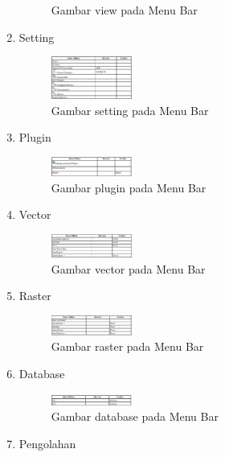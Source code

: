 \begin{enumerate}
\begin{figure}[ht]
    \caption{Gambar view pada Menu Bar}
    \label{qgis:menubar2}
    \end{figure}
\item
Setting
\begin{figure}[ht]
    \centerline{\includegraphics[width=0.25\textwidth]{figures/menubar3}}
    \caption{Gambar setting pada Menu Bar}
    \label{qgis:menubar3}
    \end{figure}
\item
Plugin
\begin{figure}[ht]
    \centerline{\includegraphics[width=0.25\textwidth]{figures/menubar4}}
    \caption{Gambar plugin pada Menu Bar}
    \label{qgis:menubar4}
    \end{figure}
\item
Vector
\begin{figure}[ht]
    \centerline{\includegraphics[width=0.25\textwidth]{figures/menubar5}}
    \caption{Gambar vector pada Menu Bar}
    \label{qgis:menubar5}
    \end{figure}
\item
Raster
\begin{figure}[ht]
    \centerline{\includegraphics[width=0.25\textwidth]{figures/menubar6}}
    \caption{Gambar raster pada Menu Bar}
    \label{qgis:menubar6}
    \end{figure}
\item
Database
\begin{figure}[ht]
    \centerline{\includegraphics[width=0.25\textwidth]{figures/menubar7}}
    \caption{Gambar database pada Menu Bar}
    \label{qgis:menubar7}
    \end{figure}
\item
Pengolahan
\begin{figure}[ht]

\end{figure}
\end{enumerate}
